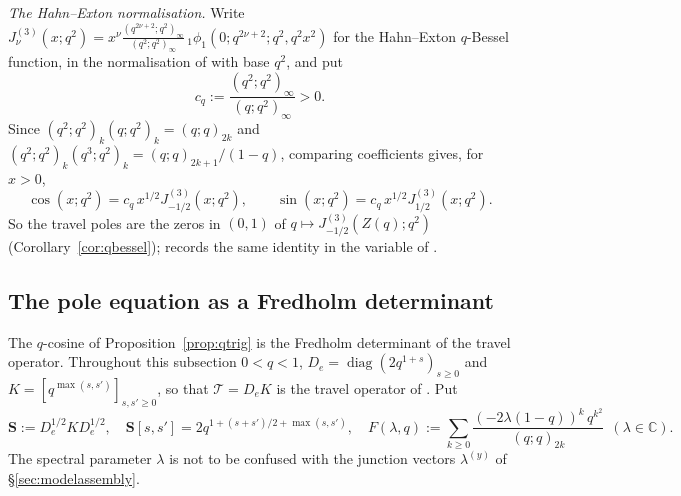 \documentclass[11pt]{article}
\theoremstyle{plain}
\theoremstyle{definition}
\theoremstyle{remark}
\newcommand{\C}{\mathbb{C}}
\theoremstyle{plain}\newtheorem*{maintheorem}{Main Theorem}
\begin{document}
\noindent\emph{The Hahn--Exton normalisation.} Write
$J^{(3)}_\nu(x;q^2)=x^\nu\frac{(q^{2\nu+2};q^2)_\infty}{(q^2;q^2)_\infty}\,
{}_1\phi_1(0;q^{2\nu+2};q^2,q^2x^2)$ for the Hahn--Exton $q$-Bessel function, in the
normalisation of \cite[eq.~(2.4)]{KoelinkSwarttouw1994} with base $q^2$, and put
\[
   c_q:=\frac{(q^2;q^2)_\infty}{(q;q^2)_\infty}>0 .
\]
Since $(q^2;q^2)_k(q;q^2)_k=(q;q)_{2k}$ and $(q^2;q^2)_k(q^3;q^2)_k=(q;q)_{2k+1}/(1-q)$, comparing
coefficients gives, for $x>0$,
\[
   \cos(x;q^2)=c_q\,x^{1/2}J^{(3)}_{-1/2}(x;q^2),\qquad
   \sin(x;q^2)=c_q\,x^{1/2}J^{(3)}_{1/2}(x;q^2).
\]
So the travel poles are the zeros in $(0,1)$ of $q\mapsto J^{(3)}_{-1/2}(Z(q);q^2)$
(Corollary~\ref{cor:qbessel}); \cite[Proposition ``structure of the zero curve'', \textup{prop:zerostructure}(i)]{Bonfioli2026bB} records the same identity in
the variable of {\cite[Appendix \textup{app:beta2}]{Bonfioli2026bB}}.


\subsection{The pole equation as a Fredholm determinant}\label{sec:fredholmdet}

The $q$-cosine of Proposition~\ref{prop:qtrig} is the Fredholm determinant of the travel operator.
Throughout this subsection $0<q<1$, $D_e=\operatorname{diag}(2q^{1+s})_{s\ge0}$ and
$K=[q^{\max(s,s')}]_{s,s'\ge0}$, so that $\mathcal T=D_eK$ is the travel operator of
{\cite[Definition ``section identity'', \textup{def:model}]{Bonfioli2026bB}}. Put
\[
   \mathbf S:=D_e^{1/2}KD_e^{1/2},\quad \mathbf S[s,s']=2q^{1+(s+s')/2+\max(s,s')},\quad
   F(\lambda,q):=\sum_{k\ge0}\frac{(-2\lambda(1-q))^k\,q^{k^2}}{(q;q)_{2k}}\ \ (\lambda\in\C).
\]
The spectral parameter $\lambda$ is not to be confused with the junction vectors
$\lambda^{(y)}$ of \S\ref{sec:modelassembly}.
\end{document}
